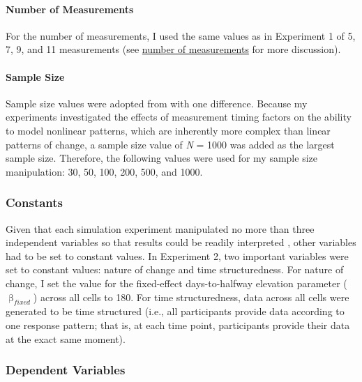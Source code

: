 \documentclass[
12pt, %
twoside,
english]{guelphthesis}
\begin{document}
\hypertarget{number-of-measurements-1}{%
\paragraph{Number of Measurements}\label{number-of-measurements-1}}

For the number of measurements, I used the same values as in Experiment 1 of 5, 7, 9, and 11 measurements (see \protect\hyperlink{number-measurements}{number of measurements} for more discussion).

\hypertarget{sample-size}{%
\paragraph{Sample Size}\label{sample-size}}

Sample size values were adopted from \textcite{coulombe2016} with one difference.
Because my experiments investigated the effects of measurement timing
factors on the ability to model nonlinear patterns, which are inherently
more complex than linear patterns of change, a sample size value of \emph{N}
= 1000 was added as the largest sample size. Therefore, the following
values were used for my sample size manipulation: 30, 50, 100, 200, 500,
and 1000.

\hypertarget{constants-exp2}{%
\subsubsection{Constants}\label{constants-exp2}}

Given that each simulation experiment manipulated no more than three independent variables so that results could be readily interpreted \autocite{halford2005}, other variables had to be set to constant values. In Experiment 2, two important variables were set to constant values: nature of change and time structuredness. For nature of change, I set the value for the fixed-effect days-to-halfway elevation parameter (\(\upbeta_{fixed}\)) across all cells to 180. For time structuredness, data across all cells were generated to be time structured (i.e., all participants provide data according to one response pattern; that is, at each time point, participants provide their data at the exact same moment).

\hypertarget{dependent-variables-1}{%
\subsubsection{Dependent Variables}\label{dependent-variables-1}}
\end{document}
